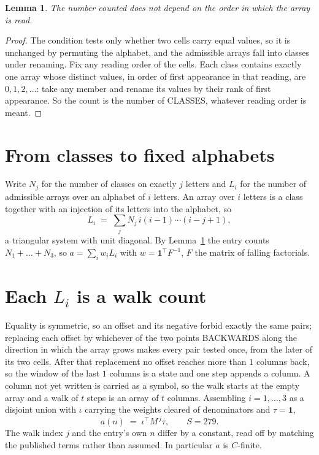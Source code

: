 \documentclass[11pt,a4paper]{article}
\theoremstyle{plain}
\newtheorem{lemma}[theorem]{Lemma}
\theoremstyle{definition}
\begin{document}
\begin{lemma}\label{lem:order}
The number counted does not depend on the order in which the array is read.
\end{lemma}

\begin{proof}
The condition tests only whether two cells carry equal values, so it is unchanged by permuting
the alphabet, and the admissible arrays fall into classes under renaming. Fix any reading order
of the cells. Each class contains exactly one array whose distinct values, in order of first
appearance in that reading, are $0,1,2,\dots$: take any member and rename its values by their
rank of first appearance. So the count is the number of CLASSES, whatever reading order is
meant.
\end{proof}

\section{From classes to fixed alphabets}

Write $N_j$ for the number of classes on exactly $j$ letters and $L_i$ for the number of
admissible arrays over an alphabet of $i$ letters. An array over $i$ letters is a class together
with an injection of its letters into the alphabet, so
\[
L_i\;=\;\sum_j N_j\,i(i-1)\cdots(i-j+1),
\]
a triangular system with unit diagonal. By Lemma~\ref{lem:order} the entry counts
$N_1+\dots+N_{3}$, so $a=\sum_i w_iL_i$ with $w=\mathbf{1}^{\!\top}F^{-1}$, $F$ the
matrix of falling factorials.

\section{Each $L_i$ is a walk count}

Equality is symmetric, so an offset and its negative forbid exactly the same pairs; replacing
each offset by whichever of the two points BACKWARDS along the direction in which the array
grows makes every pair tested once, from the later of its two cells. After that replacement no
offset reaches more than $1$ columns back, so the window of the last $1$
columns is a state and one step appends a column. A column not yet written is
carried as a symbol, so the walk starts at the empty array and a walk of $t$ steps is an array
of $t$ columns. Assembling $i=1,\dots,3$ as a disjoint union with $\iota$ carrying the
weights cleared of denominators and $\tau=\mathbf{1}$,
\[
a(n)\;=\;\iota^{\!\top}M^{\,j}\tau ,\qquad S=279.
\]
The walk index $j$ and the entry's own $n$ differ by a constant, read off by matching the
published terms rather than assumed. In particular $a$ is $C$-finite.
\end{document}
